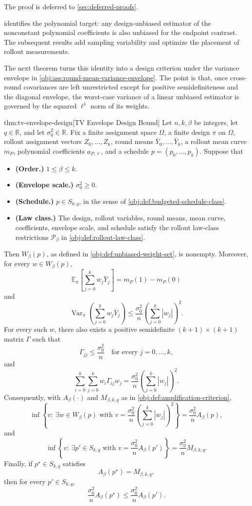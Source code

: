 \documentclass[11pt]{article}
\begin{document}
The proof is deferred to \cref{sec:deferred-proofs}.

 identifies the polynomial target: any design-unbiased estimator of the nonconstant polynomial coefficients is also unbiased for the endpoint contrast. The subsequent results add sampling variability and optimize the placement of rollout measurements.

The next theorem turns this identity into a design criterion under the variance envelope in \cref{obj:ass:round-mean-variance-envelope}. The point is that, once cross-round covariances are left unrestricted except for positive semidefiniteness and the diagonal envelope, the worst-case variance of a linear unbiased estimator is governed by the squared \(\ell^1\) norm of its weights.

\begin{theoremv}{thm:tv-envelope-design}[TV Envelope Design Bound]
Let \(n,k,\beta\) be integers, let \(q\in\mathbb R\), and let \(\sigma_0^2\in\mathbb R\). Fix a finite assignment space \(\Omega\), a finite design \(\pi\) on \(\Omega\), rollout assignment vectors \(Z_0,\ldots,Z_k\), round means \(\bar Y_0,\ldots,\bar Y_k\), a rollout mean curve \(m_P\), polynomial coefficients \(a_{P,\ell}\), and a schedule \(p=(p_0,\ldots,p_k)\). Suppose that
\begin{itemize}
\item \textbf{(Order.)} \(1\le \beta\le k\).
\item \textbf{(Envelope scale.)} \(\sigma_0^2\ge 0\).
\item \textbf{(Schedule.)} \(p\in S_{k,q}\), in the sense of \cref{obj:def:budgeted-schedule-class}.
\item \textbf{(Law class.)} The design, rollout variables, round means, mean curve, coefficients, envelope scale, and schedule satisfy the rollout law-class restrictions \(\mathcal P_\beta\) in \cref{obj:def:rollout-law-class}.
\end{itemize}
Then \(W_\beta(p)\), as defined in \cref{obj:def:unbiased-weight-set}, is nonempty. Moreover, for every \(w\in W_\beta(p)\),
\[
\mathbb E_\pi\!\left[\sum_{j=0}^k w_j\bar Y_j\right]=m_P(1)-m_P(0)
\]
and
\[
\operatorname{Var}_\pi\!\left(\sum_{j=0}^k w_j\bar Y_j\right)
\le
\frac{\sigma_0^2}{n}\left(\sum_{j=0}^k |w_j|\right)^2 .
\]
For every such \(w\), there also exists a positive semidefinite \((k+1)\times(k+1)\) matrix \(\Gamma\) such that
\[
\Gamma_{jj}\le \frac{\sigma_0^2}{n}\quad\text{for every }j=0,\ldots,k,
\]
and
\[
\sum_{i=0}^k\sum_{j=0}^k w_i\Gamma_{ij}w_j
=
\frac{\sigma_0^2}{n}\left(\sum_{j=0}^k |w_j|\right)^2 .
\]
Consequently, with \(A_\beta(\cdot)\) and \(M_{\beta,k,q}\) as in \cref{obj:def:amplification-criterion},
\[
\inf\left\{
v:\ \exists w\in W_\beta(p)\text{ with }
v=\frac{\sigma_0^2}{n}\left(\sum_{j=0}^k |w_j|\right)^2
\right\}
=
\frac{\sigma_0^2}{n}A_\beta(p),
\]
and
\[
\inf\left\{
v:\ \exists p'\in S_{k,q}\text{ with }
v=\frac{\sigma_0^2}{n}A_\beta(p')
\right\}
=
\frac{\sigma_0^2}{n}M_{\beta,k,q}.
\]
Finally, if \(p^\star\in S_{k,q}\) satisfies
\[
A_\beta(p^\star)=M_{\beta,k,q},
\]
then for every \(p'\in S_{k,q}\),
\[
\frac{\sigma_0^2}{n}A_\beta(p^\star)
\le
\frac{\sigma_0^2}{n}A_\beta(p').
\]
\end{theoremv}
\end{document}
